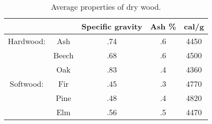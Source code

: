   \begin{center}
    \renewcommand{\arraystretch}{1.5}
    \begin{table}\centering
      \begin{tabular}{|c|c||c|c|c|}\hline
    &&\textbf{Specific gravity}& \textbf{Ash \%}&\textbf{cal/g} \\\hline\hline
    Hardwood: & Ash   & .74                       & .6              & 
    4450           \\\hline
    & Beech & .68                       & .6              & 4500           
    \\\hline
    & Oak   & .83                       & .4              & 4360           
    \\\hline
    Softwood: & Fir   & .45                       & .3              & 
    4770           \\\hline
    & Pine  & .48                       & .4              & 4820           
    \\\hline
    & Elm   & .56                       & .5              & 4470\\\hline
  \end{tabular}
\caption{Average properties of dry wood.}
\label{tab:propertiesoffuelwood}
\end{table}
\end{center}

